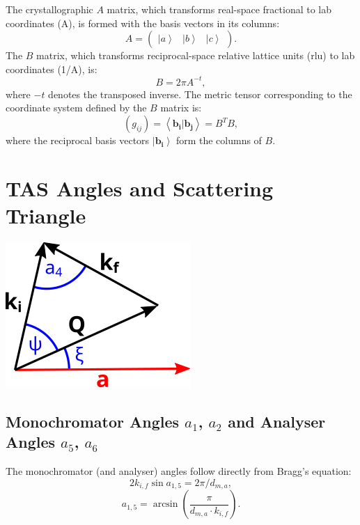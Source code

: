 \documentclass{article}
\begin{document}
The crystallographic $A$ matrix, which transforms real-space fractional to lab coordinates (A), is formed with the basis vectors in its columns:
\begin{equation}
	A = \left(
		\begin{array}{ccc}
			\left| a \right> & \left| b \right> & \left| c \right>
		\end{array}
	\right).
\end{equation}
The $B$ matrix, which transforms reciprocal-space relative lattice units (rlu) to lab coordinates (1/A), is:
\begin{equation} B = 2 \pi A^{-t}, \end{equation}
where $-t$ denotes the transposed inverse.
The metric tensor corresponding to the coordinate system defined by the $B$ matrix is:
\begin{equation} \left(g_{ij}\right) = \left<\bm{b_i} | \bm{b_j} \right> = B^T B, \end{equation}
where the reciprocal basis vectors $\left| \bm{b_i} \right>$ form the columns of $B$.



\section{TAS Angles and Scattering Triangle}
\begin{center}
	\includegraphics[width = 0.2 \textwidth]{triangle}
\end{center}

\subsection*{Monochromator Angles $a_1$, $a_2$ and Analyser Angles $a_5$, $a_6$}

The monochromator (and analyser) angles follow directly from Bragg's equation:
\begin{equation} 2 k_{i,f} \sin a_{1,5} = 2 \pi / d_{m,a}, \end{equation}
\begin{equation} \boxed{ a_{1,5} = \arcsin \left( \frac{\pi}{d_{m,a} \cdot k_{i,f}} \right). } \end{equation}
\end{document}
